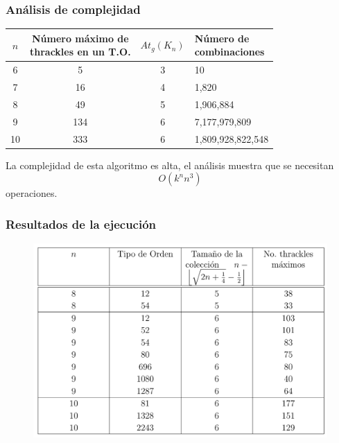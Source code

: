 \begin{frame} \frametitle{Análisis de complejidad}
\begin{table}
	\centering
	\begin{tabular}{|c|c|c|l|}
		\hline
		$n$ & \makecell{Número máximo de \\ thrackles en un T.O.} &$At_g(K_n)$& \makecell{Número de \\      combinaciones} \\
		\hline
		6 & 5 & 3 & 10 \\ \hline
		7 & 16 & 4 & 1,820 \\\hline
		8 & 49 & 5 & 1,906,884 \\\hline
		9 & 134 & 6 & 7,177,979,809 \\\hline
		10 & 333 & 6 & 1,809,928,822,548 \\ \hline
	\end{tabular}
\end{table}
La complejidad de esta algoritmo es alta, el análisis muestra que se necesitan
\begin{equation*}\displaystyle
O(k^n n^3)
\end{equation*}
operaciones.
\end{frame}
\begin{frame} \frametitle{Resultados de la ejecución}
\begin{figure}
	\includegraphics[width=1\linewidth]{images/descomposiciones}
\end{figure}
\end{frame}
